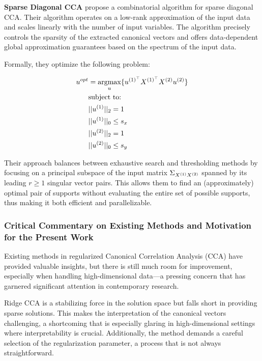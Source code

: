 \textbf{Sparse Diagonal CCA}\cite{asteris2016simple} propose a combinatorial algorithm for sparse diagonal CCA. Their algorithm operates on a low-rank approximation of the input data and scales linearly with the number of input variables.
The algorithm precisely controls the sparsity of the extracted canonical vectors and offers data-dependent global approximation guarantees based on the spectrum of the input data.

Formally, they optimize the following problem:

\begin{align}
    \label{eq:asteris}
    u^{opt}&=\underset{u}{\mathrm{argmax}}\{ u^{(1)^{\top}}X^{(1)^{\top}} X^{(2)}u^{(2)}\}\\ 
    &\text{subject to:} \notag \\
    &||u^{(1)}||_2 = 1 \\
    &||u^{(1)}||_0 \leq s_x \\
    &||u^{(2)}||_2 = 1 \\
    &||u^{(2)}||_0 \leq s_y
\end{align}

Their approach balances between exhaustive search and thresholding methods by focusing on a principal subspace of the input matrix $\Sigma_{X^{(1)}X^{(2)}}$ spanned by its leading \( r \geq 1 \) singular vector pairs.
This allows them to find an (approximately) optimal pair of supports without evaluating the entire set of possible supports, thus making it both efficient and parallelizable.

\subsubsection{Critical Commentary on Existing Methods and Motivation for the Present Work}

Existing methods in regularized Canonical Correlation Analysis (CCA) have provided valuable insights, but there is still much room for improvement, especially when handling high-dimensional data—a pressing concern that has garnered significant attention in contemporary research.

Ridge CCA is a stabilizing force in the solution space but falls short in providing sparse solutions.
This makes the interpretation of the canonical vectors challenging, a shortcoming that is especially glaring in high-dimensional settings where interpretability is crucial.
Additionally, the method demands a careful selection of the regularization parameter, a process that is not always straightforward.

